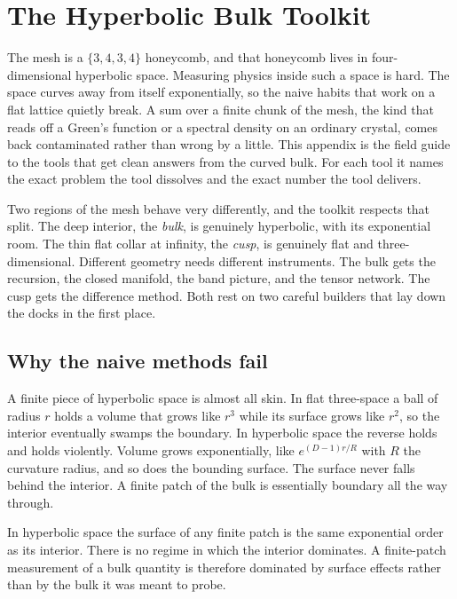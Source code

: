 \section{The Hyperbolic Bulk Toolkit}

The mesh is a $\{3,4,3,4\}$ honeycomb, and that honeycomb lives in four-dimensional hyperbolic space. Measuring physics inside such a space is hard. The space curves away from itself exponentially, so the naive habits that work on a flat lattice quietly break. A sum over a finite chunk of the mesh, the kind that reads off a Green's function or a spectral density on an ordinary crystal, comes back contaminated rather than wrong by a little. This appendix is the field guide to the tools that get clean answers from the curved bulk. For each tool it names the exact problem the tool dissolves and the exact number the tool delivers.

Two regions of the mesh behave very differently, and the toolkit respects that split. The deep interior, the \emph{bulk}, is genuinely hyperbolic, with its exponential room. The thin flat collar at infinity, the \emph{cusp}, is genuinely flat and three-dimensional. Different geometry needs different instruments. The bulk gets the recursion, the closed manifold, the band picture, and the tensor network. The cusp gets the difference method. Both rest on two careful builders that lay down the docks in the first place.

\subsection{Why the naive methods fail}

A finite piece of hyperbolic space is almost all skin. In flat three-space a ball of radius $r$ holds a volume that grows like $r^3$ while its surface grows like $r^2$, so the interior eventually swamps the boundary. In hyperbolic space the reverse holds and holds violently. Volume grows exponentially, like $e^{(D-1)r/R}$ with $R$ the curvature radius, and so does the bounding surface. The surface never falls behind the interior. A finite patch of the bulk is essentially boundary all the way through.

\begin{principle}
In hyperbolic space the surface of any finite patch is the same exponential order as its interior. There is no regime in which the interior dominates. A finite-patch measurement of a bulk quantity is therefore dominated by surface effects rather than by the bulk it was meant to probe.
\end{principle}

